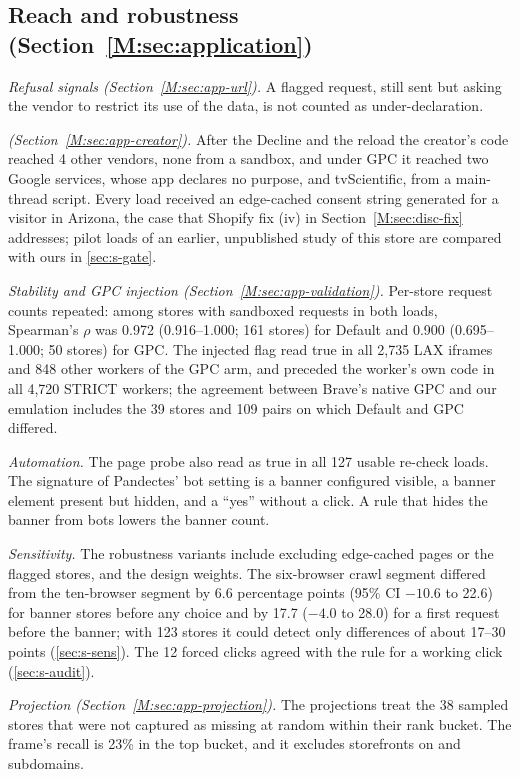 \documentclass[preprint,11pt,authoryear,a4paper]{elsarticle}
\begin{document}
\subsection*{Reach and robustness (Section~\ref*{M:sec:application})}

\emph{Refusal signals (Section~\ref*{M:sec:app-url}).} A flagged request, still sent but asking the vendor to restrict its use of the data, is not counted as under-declaration.

\emph{\storeC (Section~\ref*{M:sec:app-creator}).} After the Decline and the reload the creator's code reached 4 other vendors, none from a sandbox, and under GPC it reached two Google services, whose app declares no purpose, and tvScientific, from a main-thread script. Every \storeC load received an edge-cached consent string generated for a visitor in Arizona, the case that Shopify fix (iv) in Section~\ref*{M:sec:disc-fix} addresses; pilot loads of an earlier, unpublished study of this store are compared with ours in \ref{sec:s-gate}.

\emph{Stability and GPC injection (Section~\ref*{M:sec:app-validation}).} Per-store request counts repeated: among stores with sandboxed requests in both loads, Spearman's $\rho$ was 0.972 (0.916--1.000; 161 stores) for Default and 0.900 (0.695--1.000; 50 stores) for GPC. The injected flag read true in all 2,735 LAX iframes and 848 other workers of the GPC arm, and preceded the worker's own code in all 4,720 STRICT workers; the agreement between Brave's native GPC and our emulation includes the 39 stores and 109 pairs on which Default and GPC differed.

\emph{Automation.} The page probe also read  as true in all 127 usable re-check loads. The signature of Pandectes' bot setting is a banner configured visible, a banner element present but hidden, and a ``yes'' without a click. A rule that hides the banner from bots lowers the banner count.

\emph{Sensitivity.} The robustness variants include excluding edge-cached pages or the flagged stores, and the design weights. The six-browser crawl segment differed from the ten-browser segment by 6.6 percentage points (95\% CI $-10.6$ to 22.6) for banner stores before any choice and by 17.7 ($-4.0$ to 28.0) for a first request before the banner; with 123 stores it could detect only differences of about 17--30 points (\ref{sec:s-sens}). The 12 forced clicks agreed with the rule for a working click (\ref{sec:s-audit}).

\emph{Projection (Section~\ref*{M:sec:app-projection}).} The projections treat the 38 sampled stores that were not captured as missing at random within their rank bucket. The frame's recall is 23\% in the top bucket, and it excludes storefronts on  and  subdomains.
\end{document}
